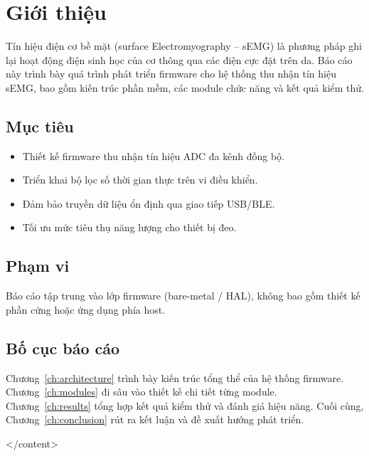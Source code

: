 \chapter{Giới thiệu}
\label{ch:intro}

Tín hiệu điện cơ bề mặt (surface Electromyography -- sEMG) là phương pháp ghi lại hoạt động điện sinh học của cơ thông qua các điện cực đặt trên da. Báo cáo này trình bày quá trình phát triển firmware cho hệ thống thu nhận tín hiệu sEMG, bao gồm kiến trúc phần mềm, các module chức năng và kết quả kiểm thử.

\section{Mục tiêu}
\begin{itemize}
    \item Thiết kế firmware thu nhận tín hiệu ADC đa kênh đồng bộ.
    \item Triển khai bộ lọc số thời gian thực trên vi điều khiển.
    \item Đảm bảo truyền dữ liệu ổn định qua giao tiếp USB/BLE.
    \item Tối ưu mức tiêu thụ năng lượng cho thiết bị đeo.
\end{itemize}

\section{Phạm vi}
Báo cáo tập trung vào lớp firmware (bare-metal / HAL), không bao gồm thiết kế phần cứng hoặc ứng dụng phía host.

\section{Bố cục báo cáo}
Chương~\ref{ch:architecture} trình bày kiến trúc tổng thể của hệ thống firmware. Chương~\ref{ch:modules} đi sâu vào thiết kế chi tiết từng module. Chương~\ref{ch:results} tổng hợp kết quả kiểm thử và đánh giá hiệu năng. Cuối cùng, Chương~\ref{ch:conclusion} rút ra kết luận và đề xuất hướng phát triển.

</content>